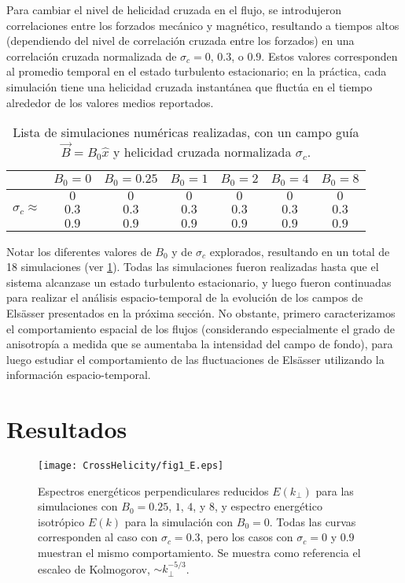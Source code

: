Para cambiar el nivel de helicidad cruzada en el flujo, se
introdujeron correlaciones entre los forzados mecánico y magnético,
resultando a tiempos altos (dependiendo del nivel de correlación
cruzada entre los forzados) en una correlación cruzada normalizada de
$\sigma_c=0$, $0.3$, o $0.9$. Estos valores corresponden al promedio
temporal en el estado turbulento estacionario; en la práctica, cada
simulación tiene una helicidad cruzada instantánea que fluctúa en el
tiempo alrededor de los valores medios reportados.

\begin{table}
\centering
\begin{tabular}{|l||c||c||c||c||c||c|}
\hline
        & $B_0=0$ & $B_0 = 0.25$ & $B_0 = 1$ & $B_0 = 2$ & $B_0 = 4$ & $B_0 = 8$ \\ \hline\hline
              & $0$ & $0$ & $0$ & $0$ & $0$ & $0$ \\ \cline{2-7} 
$\sigma_c \approx $ & $0.3$ & $0.3$ & $0.3$ & $0.3$ & $0.3$ & $0.3$ \\ \cline{2-7} 
              & $0.9$ & $0.9$ & $0.9$ & $0.9$ & $0.9$ & $0.9$ \\ \hline
\end{tabular}
\caption{Lista de simulaciones numéricas realizadas, con un campo guía
$\vec{B} = B_0 \hat{x}$ y helicidad cruzada normalizada $\sigma_c$.}
\label{tab:listSim}
\end{table}

Notar los diferentes valores de $B_0$ y de $\sigma_c$ explorados,
resultando en un total de 18 simulaciones
(ver \cref{tab:listSim}). Todas las simulaciones fueron realizadas
hasta que el sistema alcanzase un estado turbulento estacionario, y
luego fueron continuadas para realizar el análisis espacio-temporal de
la evolución de los campos de Els\"asser presentados en la próxima
sección. No obstante, primero caracterizamos el comportamiento
espacial de los flujos (considerando especialmente el grado de
anisotropía a medida que se aumentaba la intensidad del campo de
fondo), para luego estudiar el comportamiento de las fluctuaciones de
Els\"asser utilizando la información espacio-temporal.

\section{Resultados}\label{sec4:results}

\begin{figure}
\centering
\texttt{[image: CrossHelicity/fig1\_E.eps]}
\caption{Espectros energéticos perpendiculares reducidos $E(k_\perp)$ para las
  simulaciones con $B_0=0.25$, $1$, $4$, y $8$, y espectro energético
  isotrópico $E(k)$ para la simulación con $B_0=0$. Todas las curvas
  corresponden al caso con $\sigma_c = 0.3$, pero los casos con
  $\sigma_c = 0$ y $0.9$ muestran el mismo comportamiento. Se muestra como
  referencia el escaleo de Kolmogorov, $\sim k_\perp^{-5/3}$.}
\label{fig4-1:E}
\end{figure}

